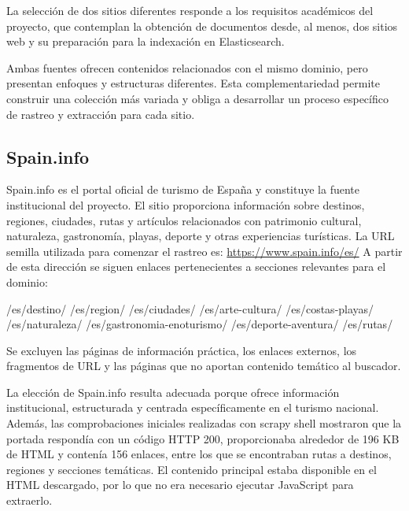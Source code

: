 La selección de dos sitios diferentes responde a los requisitos académicos del proyecto, que contemplan la obtención de documentos desde, al menos, dos sitios web y su preparación para la indexación en Elasticsearch.

Ambas fuentes ofrecen contenidos relacionados con el mismo dominio, pero presentan enfoques y estructuras diferentes. Esta complementariedad permite construir una colección más variada y obliga a desarrollar un proceso específico de rastreo y extracción para cada sitio.

\subsection{Spain.info}
Spain.info es el portal oficial de turismo de España y constituye la fuente institucional del proyecto. El sitio proporciona información sobre destinos, regiones, ciudades, rutas y artículos relacionados con patrimonio cultural, naturaleza, gastronomía, playas, deporte y otras experiencias turísticas.
La URL semilla utilizada para comenzar el rastreo es:
\url{https://www.spain.info/es/}
A partir de esta dirección se siguen enlaces pertenecientes a secciones relevantes para el dominio:

/es/destino/
/es/region/
/es/ciudades/
/es/arte-cultura/
/es/costas-playas/
/es/naturaleza/
/es/gastronomia-enoturismo/
/es/deporte-aventura/
/es/rutas/

Se excluyen las páginas de información práctica, los enlaces externos, los fragmentos de URL y las páginas que no aportan contenido temático al buscador.

La elección de Spain.info resulta adecuada porque ofrece información institucional, estructurada y centrada específicamente en el turismo nacional. Además, las comprobaciones iniciales realizadas con scrapy shell mostraron que la portada respondía con un código HTTP 200, proporcionaba alrededor de 196 KB de HTML y contenía 156 enlaces, entre los que se encontraban rutas a destinos, regiones y secciones temáticas. El contenido principal estaba disponible en el HTML descargado, por lo que no era necesario ejecutar JavaScript para extraerlo.

